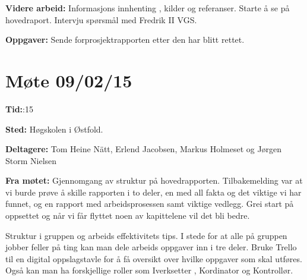 \vspace{20pt}

\hspace{-17pt}\textbf{Videre arbeid:}\newline
Informasjons innhenting , kilder og referanser.\newline
Starte å se på hovedraport.\newline
Intervju spørsmål med Fredrik II VGS.\newline

\hspace{-17pt}\textbf{Oppgaver:}\newline
Sende forprosjektrapporten etter den har blitt rettet.\newline


\newpage




\section{Møte 09/02/15}

\vspace{30pt}
\textbf{Tid:}:15\newline

\hspace{-17pt}\textbf{Sted:}\newline 
Høgskolen i Østfold.\newline

\hspace{-17pt}\textbf{Deltagere:}\newline 
Tom Heine Nätt, Erlend Jacobsen, Markus Holmeset og Jørgen Storm Nielsen\newline

\hspace{-17pt}\textbf{Fra møtet:}\newline
Gjennomgang av struktur på hovedrapporten. Tilbakemelding var at vi burde prøve å skille rapporten i to deler, en med all fakta og det viktige vi har funnet, og en rapport med arbeidsprosessen samt viktige vedlegg. 
Grei start på oppsettet og når vi får flyttet noen av kapittelene vil det bli bedre.\newline

\hspace{-17pt}Struktur i gruppen og arbeids effektivitets tips. I stede for at alle på gruppen jobber feller på ting kan man dele arbeids oppgaver inn i tre deler. Bruke Trello til en digital oppslagstavle for å få oversikt over hvilke oppgaver som skal utføres. Også kan man ha forskjellige roller som Iverksetter , Kordinator og Kontrollør.\newline

